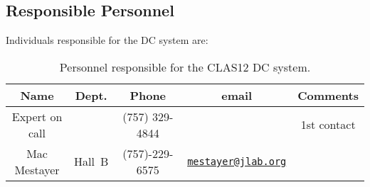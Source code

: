 \subsection{Responsible Personnel}

Individuals responsible for the DC system are:

\begin{table}[!htb]
\centering
\begin{tabular}{|c|c|c|c|c|} \hline
Name &Dept.&Phone&email&Comments \\ \hline
Expert on call &       &   (757) 329-4844    &       & 1st contact \\ \hline
Mac Mestayer&Hall~B&(757)-229-6575& \href{mailto:mestayer@jlab.org}{\nolinkurl{mestayer@jlab.org}} & \\ \hline
 \end{tabular}
\caption{Personnel responsible for the CLAS12 DC system.} 
\label{tb:dc}
\end{table}

